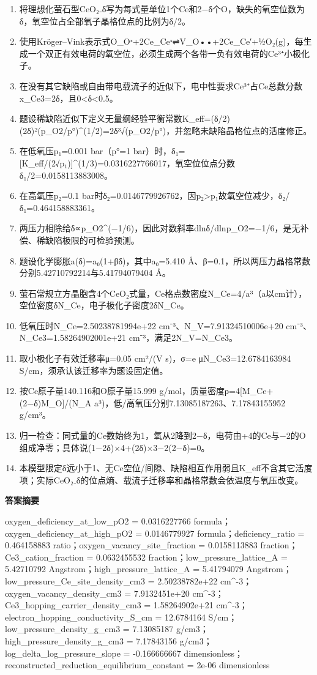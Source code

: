 \documentclass[UTF8,11pt,a4paper]{ctexart}
\begin{document}
\begin{enumerate}
\item 将理想化萤石型CeO₂₋δ写为每式量单位1个Ce和2−δ个O，缺失的氧空位数为δ，氧空位占全部氧子晶格位点的比例为δ/2。
\item 使用Kröger–Vink表示式O\_Oˣ+2Ce\_Ceˣ⇌V\_O••+2Ce\_Ce′+½O₂(g)，每生成一个双正有效电荷的氧空位，必须生成两个各带一负有效电荷的Ce³⁺小极化子。
\item 在没有其它缺陷或自由带电载流子的近似下，电中性要求Ce³⁺占Ce总数分数x\_Ce3=2δ，且0<δ<0.5。
\item 题设稀缺陷近似下定义无量纲经验平衡常数K\_eff=(δ/2)(2δ)²(p\_O2/p°)\textasciicircum{}(1/2)=2δ³√(p\_O2/p°)，并忽略未缺陷晶格位点的活度修正。
\item 在低氧压p₁=0.001 bar（p°=1 bar）时，δ₁=[K\_eff/(2√p₁)]\textasciicircum{}(1/3)=0.0316227766017，氧空位位点分数δ₁/2=0.0158113883008。
\item 在高氧压p₂=0.1 bar时δ₂=0.0146779926762，因p₂>p₁故氧空位减少，δ₂/δ₁=0.464158883361。
\item 两压力相除给δ∝p\_O2\textasciicircum{}(−1/6)，因此对数斜率dlnδ/dlnp\_O2=−1/6，是无补偿、稀缺陷极限的可检验预测。
\item 题设化学膨胀a(δ)=a₀(1+βδ)，其中a₀=5.410 Å、β=0.1，所以两压力晶格常数分别5.42710792214与5.41794079404 Å。
\item 萤石常规立方晶胞含4个CeO₂式量，Ce格点数密度N\_Ce=4/a³（a以cm计），空位密度δN\_Ce，电子极化子密度2δN\_Ce。
\item 低氧压时N\_Ce=2.50238781994e+22 cm⁻³、N\_V=7.91324510006e+20 cm⁻³、N\_Ce3=1.58264902001e+21 cm⁻³，满足2N\_V=N\_Ce3。
\item 取小极化子有效迁移率μ=0.05 cm²/(V s)，σ=e μN\_Ce3=12.6784163984 S/cm，须承认该迁移率为题设固定值。
\item 按Ce原子量140.116和O原子量15.999 g/mol，质量密度ρ=4[M\_Ce+(2−δ)M\_O]/(N\_A a³)，低/高氧压分别7.13085187263、7.17843155952 g/cm³。
\item 归一检查：同式量的Ce数始终为1，氧从2降到2−δ，电荷由+4的Ce与−2的O组成净零；具体说(1−2δ)×4+(2δ)×3−2(2−δ)=0。
\item 本模型限定δ远小于1、无Ce空位/间隙、缺陷相互作用弱且K\_eff不含其它活度项；实际CeO₂₋δ的位点熵、载流子迁移率和晶格常数会依温度与氧压改变。
\end{enumerate}
\noindent\textbf{答案摘要}\par
oxygen\_deficiency\_at\_low\_pO2 = 0.0316227766 formula；oxygen\_deficiency\_at\_high\_pO2 = 0.0146779927 formula；deficiency\_ratio = 0.464158883 ratio；oxygen\_vacancy\_site\_fraction = 0.0158113883 fraction；Ce3\_cation\_fraction = 0.0632455532 fraction；low\_pressure\_lattice\_A = 5.42710792 Angstrom；high\_pressure\_lattice\_A = 5.41794079 Angstrom；low\_pressure\_Ce\_site\_density\_cm3 = 2.50238782e+22 cm\textasciicircum{}-3；oxygen\_vacancy\_density\_cm3 = 7.9132451e+20 cm\textasciicircum{}-3；Ce3\_hopping\_carrier\_density\_cm3 = 1.58264902e+21 cm\textasciicircum{}-3；electron\_hopping\_conductivity\_S\_cm = 12.6784164 S/cm；low\_pressure\_density\_g\_cm3 = 7.13085187 g/cm3；high\_pressure\_density\_g\_cm3 = 7.17843156 g/cm3；log\_delta\_log\_pressure\_slope = -0.166666667 dimensionless；reconstructed\_reduction\_equilibrium\_constant = 2e-06 dimensionless\par
\end{document}
